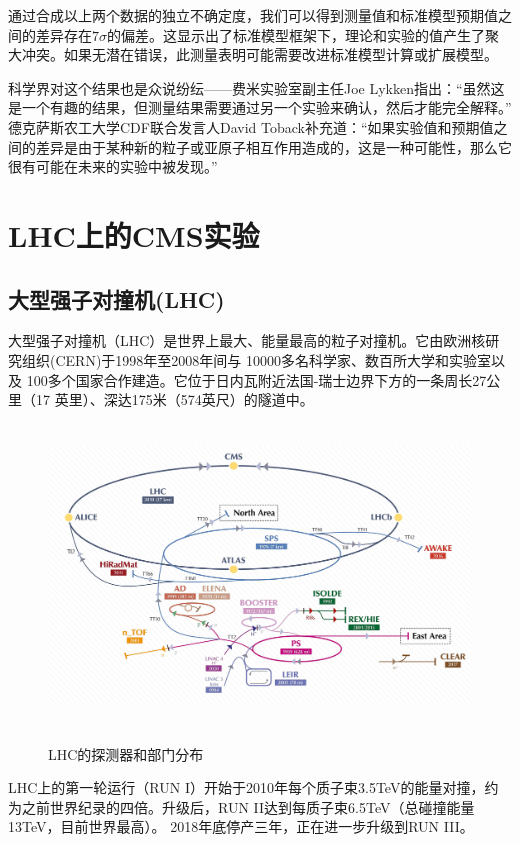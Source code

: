 通过合成以上两个数据的独立不确定度，我们可以得到测量值和标准模型预期值之间的差异存在$7\sigma$的偏差。这显示出了标准模型框架下，理论和实验的值产生了聚大冲突。如果无潜在错误，此测量表明可能需要改进标准模型计算或扩展模型。

科学界对这个结果也是众说纷纭——费米实验室副主任Joe Lykken指出：“虽然这是一个有趣的结果，但测量结果需要通过另一个实验来确认，然后才能完全解释。”
德克萨斯农工大学CDF联合发言人David Toback补充道：“如果实验值和预期值之间的差异是由于某种新的粒子或亚原子相互作用造成的，这是一种可能性，那么它很有可能在未来的实验中被发现。”

\section{LHC上的CMS实验}
\subsection{大型强子对撞机(LHC)}
大型强子对撞机（LHC）是世界上最大、能量最高的粒子对撞机。它由欧洲核研究组织(CERN)于1998年至2008年间与 10000多名科学家、数百所大学和实验室以及 100多个国家合作建造。它位于日内瓦附近法国-瑞士边界下方的一条周长27公里（17 英里）、深达175米（574英尺）的隧道中。

\begin{figure}[H]
 \centering
 \caption{LHC的探测器和部门分布}
 \includegraphics[height=8cm, width=14cm]{pictures/CERN_accelerator_complex_(cropped_2).jpeg}
 \label{fig:1.4}
\end{figure}

LHC上的第一轮运行（RUN I）开始于2010年每个质子束3.5TeV的能量对撞，约为之前世界纪录的四倍。升级后，RUN II达到每质子束6.5TeV（总碰撞能量13TeV，目前世界最高）。 2018年底停产三年，正在进一步升级到RUN III。

